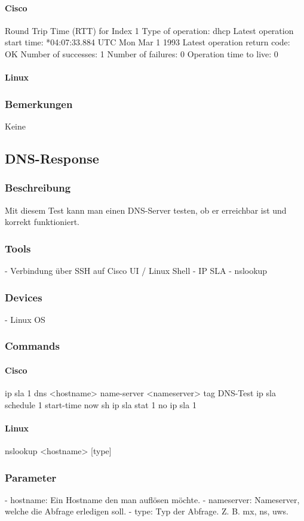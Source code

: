 \documentclass[a4,12pt]{scrartcl}
\begin{document}
\paragraph{Cisco}
Round Trip Time (RTT) for       Index 1
Type of operation: dhcp
Latest operation start time: *04:07:33.884 UTC Mon Mar 1 1993
Latest operation return code: OK
Number of successes: 1
Number of failures: 0
Operation time to live: 0
\paragraph{Linux}
\subsubsection{Bemerkungen}
Keine


\subsection{DNS-Response}
\subsubsection{Beschreibung}
Mit diesem Test kann man einen DNS-Server testen, ob er erreichbar ist und korrekt funktioniert.
\subsubsection{Tools}
- Verbindung über SSH auf Cisco UI / Linux Shell
- IP SLA
- nslookup
\subsubsection{Devices}
- Linux OS
\subsubsection{Commands}
\paragraph{Cisco}
ip sla 1
dns <hostname> name-server <nameserver>
tag DNS-Test
ip sla schedule 1 start-time now
sh ip sla stat 1
no ip sla 1
			
\paragraph{Linux}
nslookup <hostname> [type]
\subsubsection{Parameter}
- hostname: Ein Hostname den man auflösen möchte.
- nameserver: Nameserver, welche die Abfrage erledigen soll.
- type: Typ der Abfrage. Z. B. mx, ns, uws.
\end{document}
